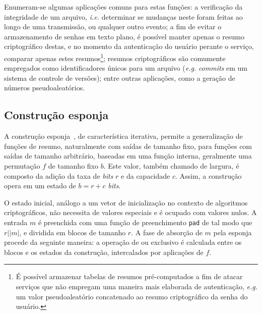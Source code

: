 \documentclass{ufsctex/ufsctex}
\newcommand{\length}[1]{\vert{} #1 \vert{}}
\begin{document}
Enumeram-se algumas aplicações comuns para estas funções: a verificação da
integridade de um arquivo, \emph{i.e.} determinar se mudanças neste foram
feitas ao longo de uma transmissão, ou qualquer outro evento; a fim de evitar o
armazenamento de senhas em texto plano, é possível manter apenas o resumo
criptográfico destas, e no momento da autenticação do usuário perante o
serviço, comparar apenas estes resumos\footnote{É possível armazenar tabelas de
resumos pré-computados a fim de atacar serviços que não empregam uma maneira
mais elaborada de autenticação, \emph{e.g.} um valor pseudoaleatório
concatenado ao resumo criptográfico da senha do usuário.}; resumos
criptográficos são comumente empregados como identificadores únicos para um
arquivo (\emph{e.g.} \emph{commits} em um sistema de controle de versões);
entre outras aplicações, como a geração de números pseudoaleatórios.

\subsection{Construção esponja}\label{subsection:sponge}

A construção esponja~\cite{SpongeReference}, de característica iterativa,
permite a generalização de funções de resumo, naturalmente com saídas de
tamanho fixo, para funções com saídas de tamanho arbitrário, baseadas em uma
função interna, geralmente uma permutação $f$ de tamanho fixo $b$. Este valor,
também chamado de largura, é composto da adição da taxa de \emph{bits} $r$ e da
capacidade $c$. Assim, a construção opera em um estado de $b = r + c$
\emph{bits}.

O estado inicial, análogo a um vetor de inicialização no contexto de algoritmos
criptográficos, não necessita de valores especiais e é ocupado com valores
nulos. A entrada $m$ é preenchida com uma função de preenchimento \texttt{pad}
de tal modo que $r \mid \length{m}$, e dividida em blocos de tamanho $r$. A
fase de absorção de $m$ pela esponja procede da seguinte maneira: a operação de
ou exclusivo é calculada entre os blocos e os estados da construção,
intercalados por aplicações de $f$.
\end{document}
